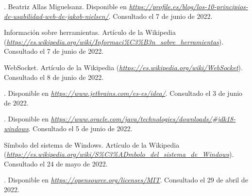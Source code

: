 \begin{thebibliography}{99}
. Beatriz Allas Miguelsanz. Disponible en {\it \url{https://profile.es/blog/los-10-principios-de-usabilidad-web-de-jakob-nielsen/}}. Consultado el 7 de junio de 2022.

 Información sobre herramientas. Artículo de la Wikipedia ({\it \url{https://es.wikipedia.org/wiki/Informaci%C3%B3n_sobre_herramientas}}). Consultado el 7 de junio de 2022.

 WebSocket. Artículo de la Wikipedia ({\it \url{https://es.wikipedia.org/wiki/WebSocket}}). Consultado el 8 de junio de 2022.

. Disponible en {\it \url{https://www.jetbrains.com/es-es/idea/}}. Consultado el 3 de junio de 2022.

. Disponible en {\it \url{https://www.oracle.com/java/technologies/downloads/#jdk18-windows}}. Consultado el 5 de junio de 2022.

 Símbolo del sistema de Windows. Artículo de la Wikipedia ({\it \url{https://es.wikipedia.org/wiki/S%C3%ADmbolo_del_sistema_de_Windows}}). Consultado el 24 de mayo de 2022.

. Disponible en {\it \url{https://opensource.org/licenses/MIT}}. Consultado el 29 de abril de 2022.
\end{thebibliography}